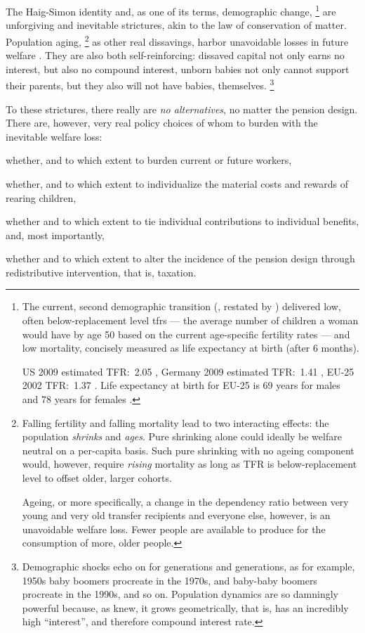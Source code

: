 The Haig-Simon identity and, as one of its terms, demographic change,
\footnote{
	The current, second demographic transition (\citealt{Davis1945}, restated by \citealt{Caldwell-1976-aa}) delivered low, often below-replacement level \glspl{tfr} --- the average number of children a woman would have by age 50 based on the current age-specific fertility rates --- and low mortality, concisely measured as life expectancy at birth (after 6 months).

	US 2009 estimated TFR:\ 2.05 \citep{CIA2009}, Germany 2009 estimated TFR:\ 1.41 \citep{CIA2009}, EU-25 2002 TFR:\ 1.37 \citep[2]{Demeny-2003-aa}.
	Life expectancy at birth for EU-25 is 69 years for males and 78 years for females \citep[2]{Demeny-2003-aa}.
}
are unforgiving and inevitable strictures, akin to the law of conservation of matter.
Population aging,
\footnote{
	Falling fertility and falling mortality lead to two interacting effects:
	the population \emph{shrinks} and \emph{ages}.
	Pure shrinking alone could ideally be welfare neutral on a per-capita basis.
	Such pure shrinking with no ageing component would, however, require \emph{rising} mortality as long as TFR is below-replacement level to offset older, larger cohorts.

	Ageing, or more specifically, a change in the dependency ratio between very young and very old transfer recipients and everyone else, however, is an unavoidable welfare loss.
	Fewer people are available to produce for the consumption of more, older people.
}
as other real dissavings, harbor unavoidable losses in future welfare \citep[for example][152]{Borsch-Supan2003}.
They are also both self-reinforcing:
dissaved capital not only earns no interest, but also no compound interest, unborn babies not only cannot support their parents, but they also will not have babies, themselves.
\footnote{
	Demographic shocks echo on for generations and generations, as for example, 1950s baby boomers procreate in the 1970s, and baby-baby boomers procreate in the 1990s, and so on.
	Population dynamics are so damningly powerful because, as \cite{Malthus1798} knew, it grows geometrically, that is, has an incredibly high ``interest'', and therefore compound interest rate.
}

To these strictures, there really are \emph{no alternatives}, no matter the pension design.
There are, however, very real policy choices of whom to burden with the inevitable welfare loss:
\begin{inparaenum} \item whether, and to which extent to burden current or future workers, \item whether, and to which extent to individualize the material costs and rewards of rearing children, \item whether and to which extent to tie individual contributions to individual benefits, and, most importantly, \item whether and to which extent to alter the incidence of the pension design through redistributive intervention, that is, taxation.
\end{inparaenum}

